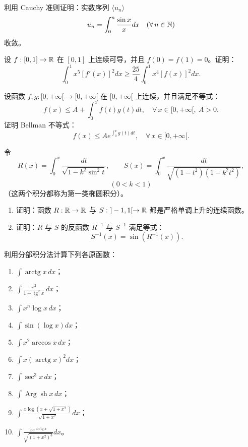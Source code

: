 \begin{exercise}
	\item 利用 Cauchy 准则证明：实数序列 \(\langle u_n\rangle\)
	\[
	u_n=\int_0^n\frac{\sin x}{x}dx\quad(\forall\,n\in\mathbb{N})
	\]
	收敛。
\end{exercise}

\begin{exercise}
	\item 设 \(f:[0,1]\to\mathbb{R}\) 在 \([0,1]\) 上连续可导，并且 \(f(0)=f(1)=0\)。证明：
	\[
	\int_0^1 x^5[f'(x)]^2dx\ge\frac{25}{4}\int_0^1 x^4[f(x)]^2dx.
	\]
\end{exercise}

\begin{exercise}
	\item 设函数 \(f,g:[0,+\infty[\to[0,+\infty[\) 在 \([0,+\infty[\) 上连续，并且满足不等式：
	\[
	f(x)\le A+\int_0^x f(t)g(t)dt,\quad\forall\,x\in[0,+\infty[,\ A>0.
	\]
	证明 Bellman 不等式：
	\[
	f(x)\le A e^{\int_0^x g(t)dt},\quad\forall\,x\in[0,+\infty[.
	\]
\end{exercise}

\begin{exercise}
	\item 令
	\[
	R(x)=\int_0^x\frac{dt}{\sqrt{1-k^2\sin^2t}},\qquad
	S(x)=\int_0^x\frac{dt}{\sqrt{(1-t^2)(1-k^2t^2)}},
	\]
	\[
	(0<k<1)
	\]
	（这两个积分都称为第一类椭圆积分）。
	\begin{enumerate}[label=\arabic*)]
		\item 证明：函数 \(R:\mathbb{R}\to\mathbb{R}\) 与 \(S:\ ]-1,1[\to\mathbb{R}\) 都是严格单调上升的连续函数。
		\item 证明：\(R\) 与 \(S\) 的反函数 \(R^{-1}\) 与 \(S^{-1}\) 满足等式：
		\[
		S^{-1}(x)=\sin\left(R^{-1}(x)\right).
		\]
	\end{enumerate}
\end{exercise}

\begin{exercise}
	\item 利用分部积分法计算下列各原函数：
	\begin{enumerate}[label=\arabic*)]
		\item \(\displaystyle\int\operatorname{arctg}x\,dx\)；
		\item \(\displaystyle\int\frac{x^2}{1+\operatorname{tg}^2x}\,dx\)；
		\item \(\displaystyle\int x^n\log x\,dx\)；
		\item \(\displaystyle\int\sin(\log x)dx\)；
		\item \(\displaystyle\int x^2\arccos x\,dx\)；
		\item \(\displaystyle\int x(\operatorname{arctg}x)^2dx\)；
		\item \(\displaystyle\int\sec^3x\,dx\)；
		\item \(\displaystyle\int\operatorname{Arg}\operatorname{sh}x\,dx\)；
		\item \(\displaystyle\int\frac{x\log\left(x+\sqrt{1+x^2}\right)}{\sqrt{1+x^2}}dx\)；
		\item \(\displaystyle\int\frac{xe^{\operatorname{arctg}x}}{\sqrt{(1+x^2)^3}}dx\)。
	\end{enumerate}
\end{exercise}

